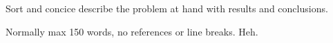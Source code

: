 Sort and concice describe the problem at hand with results and conclusions.

Normally max 150 words, no references or line breaks. Heh.
